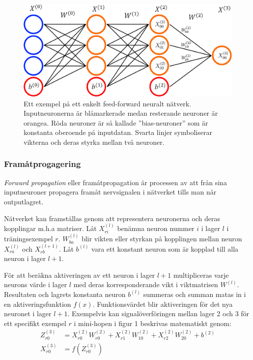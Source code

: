 \documentclass[a4paper,11pt,twoside]{article}
\begin{document}
\begin{figure}[h]\label{figFCC}
	\centering
  		\includegraphics[scale=0.4]{FCC.png}
  	\caption{Ett exempel på ett enkelt feed-forward neuralt nätverk. Inputneuronerna är blåmarkerade medan resterande neuroner är orangea. Röda neuroner är så kallade ”bias-neuroner” som är konstanta oberoende på inputdatan. Svarta linjer symboliserar vikterna och deras styrka mellan två neuroner.}
\end{figure}

\subsubsection{Framåtprogagering}
\textit{Forward propagation} eller framåtpropagation är processen av att från sina inputneuroner propagera framåt nervsignalen i nätverket tills man når outputlagret. \cite{cs231n} \cite{wikiStanford}

Nätverket kan framställas genom att representera neuronerna och deras kopplingar m.h.a matriser. Låt $X_{ri}^{(l)}$ benämna neuron nummer $i$ i lager $l$ i träningsexempel $r$. $W_{ba}^{(l)}$ blir vikten eller styrkan på kopplingen mellan neuron $X_{ra}^{(l)}$ och $X_{rb}^{(l+1)}$. Låt $b^{(l)}$ vara ett konstant neuron som är kopplad till alla neuron i lager $l+1$.  \cite{cs231n} \cite{wikiStanford}

För att beräkna aktiveringen av ett neuron i lager $l+1$ multipliceras varje neurons värde i lager $l$ med deras korresponderande vikt i viktmatrisen $W^{(l)}$. Resultaten och lagrets konstanta neuron $b^{(l)}$ summeras och summan matas in i en aktiveringsfunktion $f(x)$. Funktionsvärdet blir aktiveringen för det nya neuronet i lager $l+1$. Exempelvis kan signalöverföringen mellan lager 2 och 3 för ett specifikt exempel $r$ i mini-hopen i figur 1 beskrivas matematiskt genom: \cite{cs231n} \cite{wikiStanford}
\begin{align}
Z_{r0}^{(3)} & = X_{r0}^{(2)}W_{r0}^{(2)} + X_{r1}^{(2)}W_{10}^{(2)} + X_{r2}^{(2)}W_{20}^{(2)} + b^{(2)} \\
X_{r0}^{(3)} & = f(Z_{r0}^{(3)})
\end{align}
\end{document}
